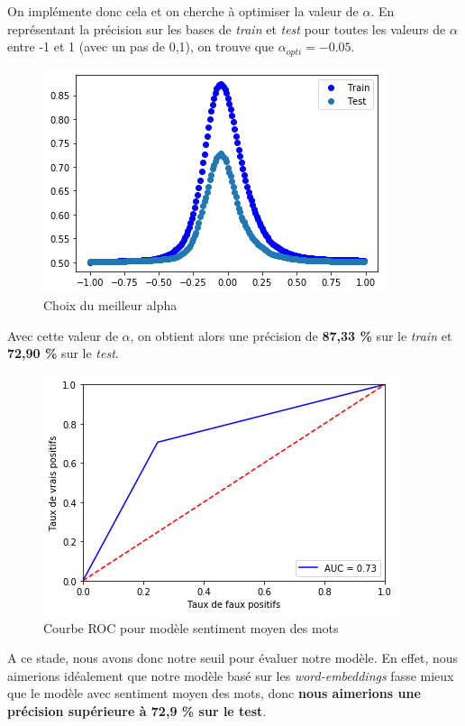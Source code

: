 \documentclass[11pt,french,french]{article}
\begin{document}
On implémente donc cela et on cherche à optimiser la valeur de
\(\alpha\). En représentant la précision sur les bases de \emph{train}
et \emph{test} pour toutes les valeurs de \(\alpha\) entre -1 et 1 (avec
un pas de 0,1), on trouve que \(\alpha_{opti} = -0.05\).

\begin{figure}
\centering
\includegraphics{img/choix_alpha.png}
\caption{Choix du meilleur alpha}
\end{figure}

Avec cette valeur de \(\alpha\), on obtient alors une précision de
\textbf{87,33 \%} sur le \emph{train} et \textbf{72,90 \%} sur le
\emph{test}.

\begin{figure}
\centering
\includegraphics{img/roc_sentiments.png}
\caption{Courbe ROC pour modèle sentiment moyen des mots}
\end{figure}

A ce stade, nous avons donc notre seuil pour évaluer notre modèle. En
effet, nous aimerions idéalement que notre modèle basé sur les
\emph{word-embeddings} fasse mieux que le modèle avec sentiment moyen
des mots, donc \textbf{nous aimerions une précision supérieure à 72,9 \%
sur le test}.
\end{document}
